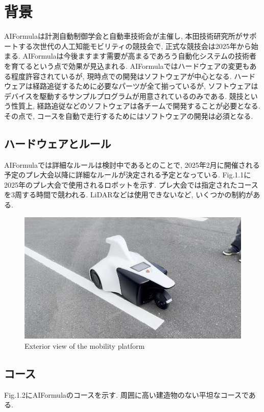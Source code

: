 
\section{背景}
AIFormulaは計測自動制御学会と自動車技術会が主催し, 本田技術研究所がサポートする次世代の人工知能モビリティの競技会で, 正式な競技会は2025年から始まる.
AIFormulaは今後ますます需要が高まるであろう自動化システムの技術者を育てるという点で効果が見込まれる.
AIFormulaではハードウェアの変更もある程度許容されているが, 現時点での開発はソフトウェアが中心となる.
ハードウェアは経路追従するために必要なパーツが全て揃っているが, ソフトウェアはデバイスを駆動するサンプルプログラムが用意されているのみである.
競技という性質上, 経路追従などのソフトウェアは各チームで開発することが必要となる.
その点で, コースを自動で走行するためにはソフトウェアの開発は必須となる.

\subsection{ハードウェアとルール}
AIFormulaでは詳細なルールは検討中であるとのことで, 2025年2月に開催される予定のプレ大会以降に詳細なルールが決定される予定となっている.
Fig.1.1に2025年のプレ大会で使用されるロボットを示す.
プレ大会では指定されたコースを3周する時間で競われる.
LiDARなどは使用できないなど, いくつかの制約がある.

\begin{figure}[H]
  \centering
 \includegraphics[keepaspectratio, scale=0.6]
      {images/ExteriorViewOfTheMobilityPlatform.png}
 \caption{Exterior view of the mobility platform}
 \label{fig:robot view}
\end{figure}

\subsection{コース}
Fig.1.2にAIFormulaのコースを示す.
周囲に高い建造物のない平坦なコースである.


